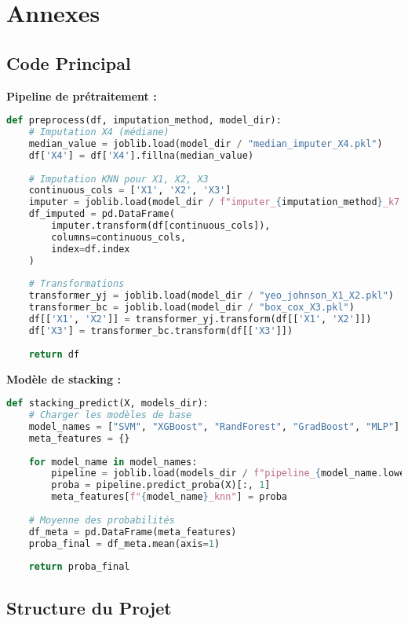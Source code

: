 \documentclass[12pt,a4paper]{article}
\begin{document}
\section{Annexes}

\subsection{Code Principal}

\textbf{Pipeline de prétraitement :}
\begin{lstlisting}[language=Python, caption=Pipeline de prétraitement]
def preprocess(df, imputation_method, model_dir):
    # Imputation X4 (médiane)
    median_value = joblib.load(model_dir / "median_imputer_X4.pkl")
    df['X4'] = df['X4'].fillna(median_value)
    
    # Imputation KNN pour X1, X2, X3
    continuous_cols = ['X1', 'X2', 'X3']
    imputer = joblib.load(model_dir / f"imputer_{imputation_method}_k7.pkl")
    df_imputed = pd.DataFrame(
        imputer.transform(df[continuous_cols]), 
        columns=continuous_cols, 
        index=df.index
    )
    
    # Transformations
    transformer_yj = joblib.load(model_dir / "yeo_johnson_X1_X2.pkl")
    transformer_bc = joblib.load(model_dir / "box_cox_X3.pkl")
    df[['X1', 'X2']] = transformer_yj.transform(df[['X1', 'X2']])
    df['X3'] = transformer_bc.transform(df[['X3']])
    
    return df
\end{lstlisting}

\textbf{Modèle de stacking :}
\begin{lstlisting}[language=Python, caption=Modèle de stacking]
def stacking_predict(X, models_dir):
    # Charger les modèles de base
    model_names = ["SVM", "XGBoost", "RandForest", "GradBoost", "MLP"]
    meta_features = {}
    
    for model_name in model_names:
        pipeline = joblib.load(models_dir / f"pipeline_{model_name.lower()}_knn.joblib")
        proba = pipeline.predict_proba(X)[:, 1]
        meta_features[f"{model_name}_knn"] = proba
    
    # Moyenne des probabilités
    df_meta = pd.DataFrame(meta_features)
    proba_final = df_meta.mean(axis=1)
    
    return proba_final
\end{lstlisting}

\subsection{Structure du Projet}
\end{document}
